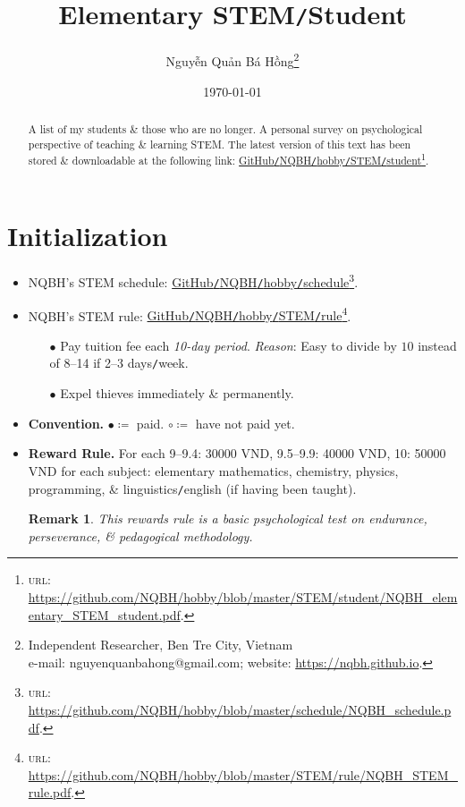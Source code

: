 \documentclass{article}
\title{Elementary STEM\texttt{/}Student}
\author{Nguyễn Quản Bá Hồng\footnote{Independent Researcher, Ben Tre City, Vietnam\\e-mail: \textsf{nguyenquanbahong@gmail.com}; website: \url{https://nqbh.github.io}.}}
\date{\today}
\newtheorem{remark}{Remark}
\begin{document}
\maketitle
\begin{abstract}
	A list of my students \& those who are no longer. A personal survey on psychological perspective of teaching \& learning STEM. The latest version of this text has been stored \& downloadable at the following link: \href{https://github.com/NQBH/hobby/blob/master/STEM/student/NQBH_elementary_STEM_student.pdf}{GitHub\texttt{/}NQBH\texttt{/}hobby\texttt{/}STEM\texttt{/}student}\footnote{\textsc{url}: \url{https://github.com/NQBH/hobby/blob/master/STEM/student/NQBH_elementary_STEM_student.pdf}.}.
\end{abstract}
\tableofcontents
\newpage


\section*{Initialization}

\begin{itemize}
	\item NQBH's STEM schedule: \href{https://github.com/NQBH/hobby/blob/master/schedule/NQBH_schedule.pdf}{GitHub\texttt{/}NQBH\texttt{/}hobby\texttt{/}schedule}\footnote{\textsc{url}: \url{https://github.com/NQBH/hobby/blob/master/schedule/NQBH_schedule.pdf}.}.
	\item NQBH's STEM rule: \href{https://github.com/NQBH/hobby/blob/master/STEM/rule/NQBH_STEM_rule.pdf}{GitHub\texttt{/}NQBH\texttt{/}hobby\texttt{/}STEM\texttt{/}rule}\footnote{\textsc{url}: \url{https://github.com/NQBH/hobby/blob/master/STEM/rule/NQBH_STEM_rule.pdf}.}.
	\begin{itemize}
		\item[$\bullet$] Pay tuition fee each \textit{10-day period}. \textit{Reason}: Easy to divide by $10$ instead of 8--14 if 2--3 days\texttt{/}week.
		\item[$\bullet$] Expel thieves immediately \& permanently.
	\end{itemize}
	\item \textbf{Convention.} $\bullet\coloneq$ paid. $\circ\coloneq$ have not paid yet.
	\item \textbf{Reward Rule.} For each 9--9.4: 30000 VND, 9.5--9.9: 40000 VND, 10: 50000 VND for each subject: elementary mathematics, chemistry, physics, programming, \& linguistics\texttt{/}english (if having been taught).
	
	\begin{remark}
		This rewards rule is a basic psychological test on endurance, perseverance, \& pedagogical methodology.
	\end{remark}
\end{itemize}
\end{document}
